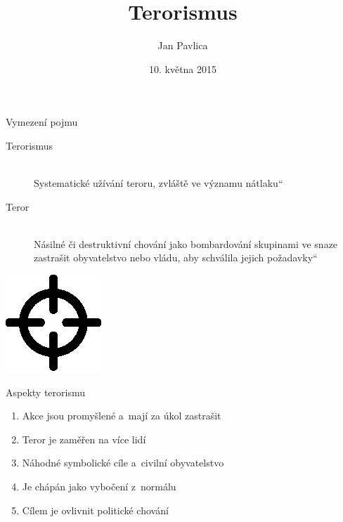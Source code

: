 \documentclass[fyma2,pdf,final]{prosper}
\newcommand{\uv}[1]{\quotedblbase #1\textquotedblleft}
\begin{document}
\title{Terorismus}
\author{Jan Pavlica}
\date{10. května 2015}
\maketitle

\begin{slide}{Vymezení pojmu}
\begin{description}
	\item[Terorismus] \hfill \\
		\uv{Systematické užívání teroru, zvláště ve významu nátlaku}
	\item[Teror] \hfill \\
		\uv{Násilné či destruktivní chování jako bombardování skupinami ve snaze zastrašit obyvatelstvo nebo vládu, aby schválila jejich požadavky}
\end{description}
\begin{center}
\includegraphics[scale=2]{target17.eps}
\end{center}
\end{slide}

\begin{slide}{Aspekty terorismu}
\begin{enumerate}
	\item Akce jsou promyšlené a~mají za úkol zastrašit
	\item Teror je zaměřen na více lidí
	\item Náhodné symbolické cíle a~civilní obyvatelstvo
	\item Je chápán jako vybočení z~normálu
	\item Cílem je ovlivnit politické chování
\end{enumerate}
\end{slide}
\end{document}
